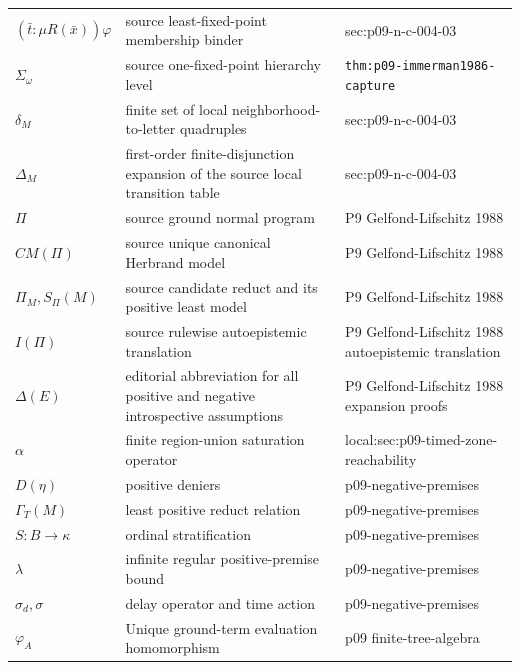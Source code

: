 \begin{longtable}{@{}p{}p{}p{}@{}}
\((\bar t:\mu R(\bar x))\varphi\) & source least-fixed-point membership binder & sec:\allowbreak{}p09-\allowbreak{}n-\allowbreak{}c-\allowbreak{}004-\allowbreak{}03 \\
\(\Sigma_\omega\) & source one-fixed-point hierarchy level & \texttt{thm:\allowbreak{}p09-\allowbreak{}immerman1986-\allowbreak{}capture} \\
\(\delta_M\) & finite set of local neighborhood-to-letter quadruples & sec:\allowbreak{}p09-\allowbreak{}n-\allowbreak{}c-\allowbreak{}004-\allowbreak{}03 \\
\(\Delta_M\) & first-order finite-disjunction expansion of the source local transition table & sec:\allowbreak{}p09-\allowbreak{}n-\allowbreak{}c-\allowbreak{}004-\allowbreak{}03 \\
\(\Pi\) & source ground normal program & P9 Gelfond-\allowbreak{}Lifschitz 1988 \\
\(CM(\Pi)\) & source unique canonical Herbrand model & P9 Gelfond-\allowbreak{}Lifschitz 1988 \\
\(\Pi_M,\allowbreak S_\Pi(M)\) & source candidate reduct and its positive least model & P9 Gelfond-\allowbreak{}Lifschitz 1988 \\
\(I(\Pi)\) & source rulewise autoepistemic translation & P9 Gelfond-\allowbreak{}Lifschitz 1988 autoepistemic translation \\
\(\Delta(E)\) & editorial abbreviation for all positive and negative introspective assumptions & P9 Gelfond-\allowbreak{}Lifschitz 1988 expansion proofs \\
\(\alpha\) & finite region-union saturation operator & local:\allowbreak{}sec:\allowbreak{}p09-\allowbreak{}timed-\allowbreak{}zone-\allowbreak{}reachability \\
\(D(\eta)\) & positive deniers & p09-\allowbreak{}negative-\allowbreak{}premises \\
\(\Gamma_T(M)\) & least positive reduct relation & p09-\allowbreak{}negative-\allowbreak{}premises \\
\(S:B\to\kappa\) & ordinal stratification & p09-\allowbreak{}negative-\allowbreak{}premises \\
\(\lambda\) & infinite regular positive-premise bound & p09-\allowbreak{}negative-\allowbreak{}premises \\
\(\sigma_d,\allowbreak \sigma\) & delay operator and time action & p09-\allowbreak{}negative-\allowbreak{}premises \\
\ensuremath{\varphi_A} & Unique ground-term evaluation homomorphism & p09 finite-\allowbreak{}tree-\allowbreak{}algebra \\

\end{longtable}
